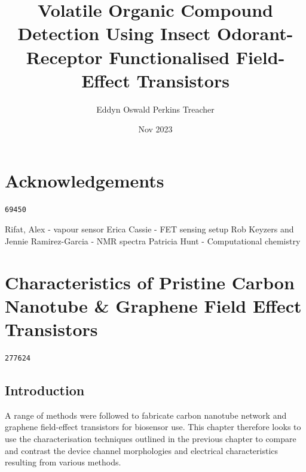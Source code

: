 \documentclass[
  a4paper,
]{scrbook}
\title{Volatile Organic Compound Detection Using Insect Odorant-Receptor
Functionalised Field-Effect Transistors}
\author{Eddyn Oswald Perkins Treacher}
\date{Nov 2023}
\renewcommand*\contentsname{Table of contents}
\newcommand\contentsname{Table of contents}
\begin{document}
\frontmatter
\maketitle
\ifdefined\Shaded\renewenvironment{Shaded}{\begin{tcolorbox}[breakable, borderline west={3pt}{0pt}{shadecolor}, enhanced, sharp corners, interior hidden, boxrule=0pt, frame hidden]}{\end{tcolorbox}}\fi

\renewcommand*\contentsname{Table of contents}
{
\setcounter{tocdepth}{2}
\tableofcontents
}
\mainmatter
{}

\hypertarget{acknowledgements}{%
\chapter*{Acknowledgements}\label{acknowledgements}}


\begin{verbatim}
69450
\end{verbatim}

Rifat, Alex - vapour sensor Erica Cassie - FET sensing setup Rob Keyzers
and Jennie Ramirez-Garcia - NMR spectra Patricia Hunt - Computational
chemistry


\hypertarget{characteristics-of-pristine-carbon-nanotube-graphene-field-effect-transistors}{%
\chapter{Characteristics of Pristine Carbon Nanotube \& Graphene Field
Effect
Transistors}\label{characteristics-of-pristine-carbon-nanotube-graphene-field-effect-transistors}}

\begin{verbatim}
277624
\end{verbatim}

\hypertarget{introduction}{%
\section{Introduction}\label{introduction}}

A range of methods were followed to fabricate carbon nanotube network
and graphene field-effect transistors for biosensor use. This chapter
therefore looks to use the characterisation techniques outlined in the
previous chapter to compare and contrast the device channel morphologies
and electrical characteristics resulting from various methods.
\end{document}
